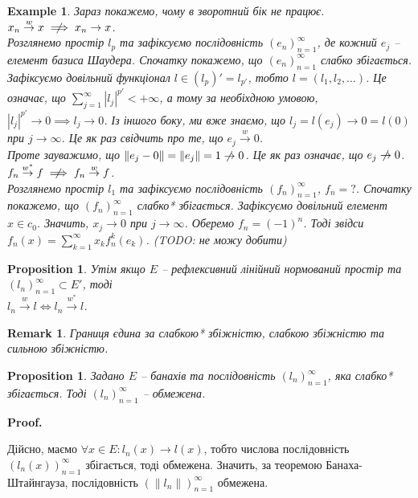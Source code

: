 \documentclass[a4paper, 10pt]{article}
\makeatletter
\theoremstyle{theoremdd}
\theoremstyle{theoremdd}
\theoremstyle{theoremdd}
\theoremstyle{theoremdd}
\newtheorem{example}[theorem]{Example}
\theoremstyle{theoremdd}
\newtheorem{proposition}[theorem]{Proposition}
\theoremstyle{theoremdd}
\newtheorem{remark}[theorem]{Remark}
\theoremstyle{theoremdd}
\theoremstyle{theoremdd}
\newcommand{\toweak}{\overset{w}{\to}}
\newcommand{\toweakstar}{\overset{w^*}{\to}}
\renewenvironment{proof}[1][Proof.\\]{\par
\pushQED{\hfill \qed}%
\normalfont \topsep6\p@\@plus6\p@\relax
\trivlist
\item\relax
{\bfseries
#1\@addpunct{.}}\hspace\labelsep\ignorespaces
}{%
\popQED\endtrivlist\@endpefalse
}
\makeatother
\begin{document}
\begin{example}
Зараз покажемо, чому в зворотний бік не працює.
\bigskip \\
$x_n \toweak x \centernot\implies x_n \to x$.\\
Розглянемо простір $l_p$ та зафіксуємо послідовність $(e_n)_{n=1}^\infty$, де кожний $e_j$ -- елемент базиса Шаудера. Спочатку покажемо, що $(e_n)_{n=1}^\infty$ слабко збігається. Зафіксуємо довільний функціонал $l \in (l_p)' = l_{p'}$, тобто $l = (l_1,l_2,\dots)$. Це означає, що $\displaystyle\sum_{j=1}^\infty |l_j|^{p'} < + \infty$, а тому за необіхдною умовою, $|l_j|^{p'} \to 0 \implies l_j \to 0$. Із іншого боку, ми вже знаємо, що $l_j = l(e_j) \to 0 = l(0)$ при $j \to \infty$. Це як раз свідчить про те, що $e_j \toweak 0$.\\
Проте зауважимо, що $\|e_j - 0 \| = \|e_j\| = 1 \centernot\to 0$. Це як раз означає, що $e_j \centernot\to 0$.
\bigskip \\
$f_n \toweakstar f \centernot\implies f_n \toweak f$.\\
Розглянемо простір $l_1$ та зафіксуємо послідовність $(f_n)_{n=1}^\infty$, $f_n = ?$. Спочатку покажемо, що $(f_n)_{n=1}^\infty$ слабко* збігається. Зафіксуємо довільний елемент $x \in c_0$. Значить, $x_j \to 0$ при $j \to \infty$. Оберемо $f_n = (-1)^n$. Тоді звідси $f_n(x) = \displaystyle\sum_{k=1}^\infty x_k f_n^k(e_k)$. (TODO: не можу добити)
\end{example}

\begin{proposition}
Утім якщо $E$ -- рефлексивний лінійний нормований простір та $(l_n)_{n=1}^\infty \subset E'$, тоді\\
$l_n \toweak l \iff l_n \toweakstar l$.
\end{proposition}

\begin{remark}
Границя єдина за слабкою* збіжністю, слабкою збіжністю та сильною збіжністю.
\end{remark}

\begin{proposition}
Задано $E$ -- банахів та послідовність $(l_n)_{n=1}^\infty$, яка слабко* збігається. Тоді $(l_n)_{n=1}^\infty$ -- обмежена.
\end{proposition}

\begin{proof}
Дійсно, маємо $\forall x \in E: l_n(x) \to l(x)$, тобто числова послідовність $(l_n(x))_{n=1}^\infty$ збігається, тоді обмежена. Значить, за теоремою Банаха-Штайнгауза, послідовність $(\|l_n\|)_{n=1}^\infty$ обмежена.
\end{proof}
\end{document}

